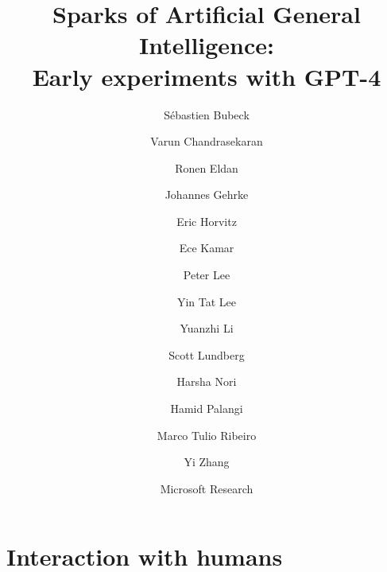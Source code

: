 \documentclass[11pt]{article}
\begin{document}


\title{%
\textbf{Sparks of Artificial General Intelligence:} \\
\textbf{Early experiments with GPT-4}}

\author{S\'ebastien Bubeck
\and Varun Chandrasekaran
\and Ronen Eldan
\and Johannes Gehrke
\and Eric Horvitz
\and Ece Kamar
\and Peter Lee
\and Yin Tat Lee
\and Yuanzhi Li
\and Scott Lundberg
\and Harsha Nori
\and Hamid Palangi
\and Marco Tulio Ribeiro
\and Yi Zhang
}

\date{Microsoft Research}

\maketitle



\tableofcontents





\clearpage


\clearpage


\clearpage


\clearpage




\clearpage
\section{Interaction with humans}
\label{sec:humans}



\clearpage


\clearpage



\clearpage


\clearpage


\newpage



\newpage
\appendix
{}








\end{document}
